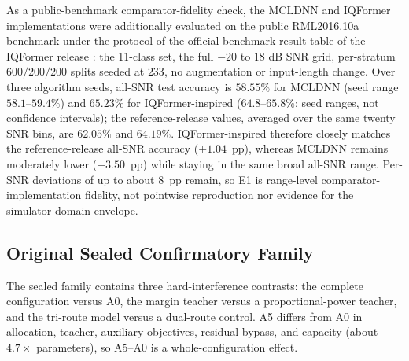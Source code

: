\documentclass[letterpaper,journal]{IEEEtran}
\begin{document}
As a public-benchmark comparator-fidelity check, the MCLDNN and IQFormer
implementations were additionally evaluated on the public RML2016.10a benchmark
\cite{oshea2016cnn} under the protocol of the official benchmark result table
of the IQFormer release \cite{shao2025iqformercode}: the 11-class set, the
full $-20$ to $18$ dB SNR grid, per-stratum $600/200/200$ splits seeded at
$233$, no augmentation or input-length change. Over three algorithm seeds,
all-SNR test accuracy is $58.55\%$ for MCLDNN (seed range
$58.1$--$59.4\%$) and $65.23\%$ for IQFormer-inspired ($64.8$--$65.8\%$;
seed ranges, not confidence intervals); the reference-release values,
averaged over the same twenty SNR bins, are $62.05\%$ and $64.19\%$.
IQFormer-inspired therefore closely matches the
reference-release all-SNR accuracy ($+1.04$~pp), whereas MCLDNN remains
moderately lower ($-3.50$~pp) while staying in the same
broad all-SNR range. Per-SNR deviations of up to about $8$~pp remain, so E1 is
range-level comparator-implementation fidelity, not pointwise reproduction nor
evidence for the simulator-domain envelope.

\subsection{Original Sealed Confirmatory Family}
The sealed family contains three hard-interference contrasts: the complete
configuration versus A0, the margin teacher versus a proportional-power
teacher, and the tri-route model versus a dual-route control. A5 differs from
A0 in allocation, teacher, auxiliary objectives, residual bypass, and capacity
(about $4.7\times$ parameters), so A5--A0 is a whole-configuration effect.
\end{document}
